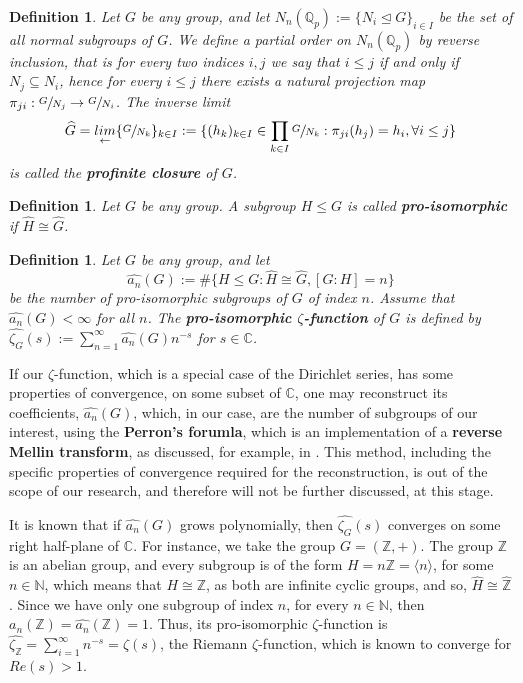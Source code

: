 \documentclass[12pt]{article}
\newtheorem{definition}[theorem]{Definition}
\begin{document}
\begin{definition}
\label{def:profinite.closure}
Let $G$ be any group, and let $N_n(\mathbb{Q}_p):=\{N_i\trianglelefteq G\}_{i\in I}$ be the set of all normal subgroups of $G$. We define a partial order on $N_n(\mathbb{Q}_p)$ by reverse inclusion, that is for every two indices $i,j$ we say that $i\leq j$ if and only if $N_j\subseteq N_i$, hence for every $i\leq j$ there exists a natural projection map $\pi_{ji}:\sfrac{G}{N_
j}\rightarrow\sfrac{G}{N_i}$. The inverse limit \[\widehat{G}=\underset{\leftarrow}{lim}\{\sfrac{G}{N_k}\}_{k\in I}:=\{(h_k)_{k\in I}\in\prod_{k\in I}\sfrac{G}{N_k} : \pi_{ji}(h_j)=h_i,\forall i\leq j\}\] is called the \textbf{profinite closure} of $G$.
\end{definition}
\begin{definition}
\label{def:pro.isomorphic}
Let $G$ be any group. A subgroup $H\leq G$ is called \textbf{pro-isomorphic} if $\widehat{H}\cong\widehat{G}$.
\end{definition}
\begin{definition}
\label{def:zeta.pro.isomorphic}
Let $G$ be any group, and let \[\hat{a_n}(G):=\#\{H\leq G : \widehat{H}\cong\widehat{G}, [G:H]=n\}\] be the number of pro-isomorphic subgroups of $G$ of index $n$. Assume that $\hat{a_n}(G)<\infty$ for all $n$. The \textbf{pro-isomorphic $\zeta$-function} of $G$ is defined by $\hat{\zeta_G}(s):=\sum_{n=1}^{\infty}\hat{a_n}(G)n^{-s}$ for $s\in\mathbb{C}$.
\end{definition}
If our $\zeta$-function, which is a special case of the Dirichlet series, has some properties of convergence, on some subset of $\mathbb{C}$, one may reconstruct its coefficients, $\hat{a_n}(G)$, which, in our case, are the number of subgroups of our interest, using the \textbf{Perron's forumla}, which is an implementation of a \textbf{reverse Mellin transform}, as discussed, for example, in \cite{MontgomeryVaughan}. This method, including the specific properties of convergence required for the reconstruction, is out of the scope of our research, and therefore will not be further discussed, at this stage.\par
It is known that if $\hat{a_n}(G)$ grows polynomially, then $\hat{\zeta_G}(s)$ converges on some right half-plane of $\mathbb{C}$. For instance, we take the group $G=(\mathbb{Z},+)$. The group $\mathbb{Z}$ is an abelian group, and every subgroup is of the form $H=n\mathbb{Z}=\langle n\rangle$, for some $n\in\mathbb{N}$, which means that $H\cong \mathbb{Z}$, as both are infinite cyclic groups, and so, $\widehat{H}\cong\widehat{\mathbb{Z}}$. Since we have only one subgroup of index $n$, for every $n\in\mathbb{N}$, then $a_n(\mathbb{Z})=\hat{a_n}(\mathbb{Z})=1$. Thus, its pro-isomorphic $\zeta$-function is $\hat{\zeta_{\mathbb{Z}}}=\sum_{i=1}^{\infty}n^{-s}=\zeta(s)$, the Riemann $\zeta$-function, which is known to converge for $Re(s)>1$.\par
\end{document}
